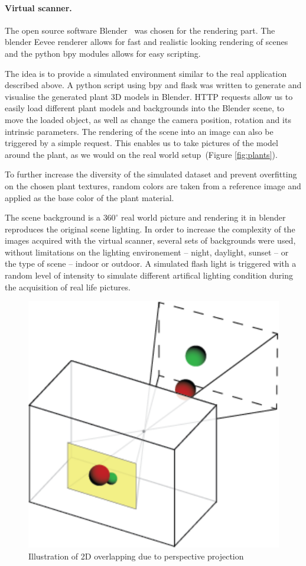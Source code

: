 \paragraph{Virtual scanner.} The open source software
Blender~\cite{blender} was chosen for the rendering part. The blender
Eevee renderer allows for fast and realistic looking rendering of
scenes and the python bpy modules allows for easy scripting.

The idea is to provide a simulated environment similar to
the real application described above. A python script using bpy and
flask was written to generate and visualise the generated plant 3D models in Blender. HTTP requests allow us to easily load different plant models and backgrounds into the Blender scene, to move the loaded object,
as well as change the camera position, rotation and its intrinsic parameters. The rendering of the scene into an image can also
be triggered by a simple request. This enables us to take pictures of the
model around the plant, as we would on the real world setup~(Figure
\ref{fig:plants}).

To further increase the diversity of the simulated dataset and prevent
overfitting on the chosen plant textures, random colors are taken
from a reference image and applied as the base color of the plant material.

The scene background is a $360^{\circ}$ real world picture and rendering it in blender reproduces the
original scene lighting. In order to increase the complexity of the
images acquired with the virtual scanner, several sets of backgrounds were
used, without limitations on the lighting environement -- night, daylight,
sunset -- or the type of scene -- indoor or outdoor. A simulated flash light is
triggered with a random level of intensity to simulate different artifical lighting condition during the
acquisition of real life pictures.

\begin{figure}[h]
    \centering \includegraphics[width=0.3\linewidth]{figures/pinhole.png}
    \caption{Illustration of 2D overlapping due to perspective
    projection } \label{fig:pinhole}
\end{figure}


